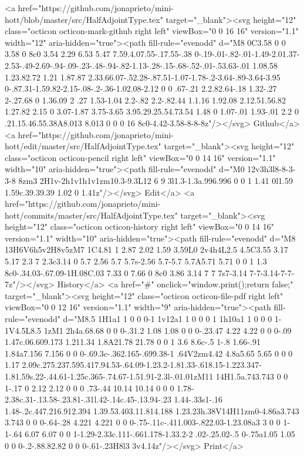       <a href="https://github.com/jonaprieto/mini-hott/blob/master/src/HalfAdjointType.tex" target="_blank"><svg height="12" class="octicon octicon-mark-github right left" viewBox="0 0 16 16" version="1.1" width="12" aria-hidden="true"><path fill-rule="evenodd" d="M8 0C3.58 0 0 3.58 0 8c0 3.54 2.29 6.53 5.47 7.59.4.07.55-.17.55-.38 0-.19-.01-.82-.01-1.49-2.01.37-2.53-.49-2.69-.94-.09-.23-.48-.94-.82-1.13-.28-.15-.68-.52-.01-.53.63-.01 1.08.58 1.23.82.72 1.21 1.87.87 2.33.66.07-.52.28-.87.51-1.07-1.78-.2-3.64-.89-3.64-3.95 0-.87.31-1.59.82-2.15-.08-.2-.36-1.02.08-2.12 0 0 .67-.21 2.2.82.64-.18 1.32-.27 2-.27.68 0 1.36.09 2 .27 1.53-1.04 2.2-.82 2.2-.82.44 1.1.16 1.92.08 2.12.51.56.82 1.27.82 2.15 0 3.07-1.87 3.75-3.65 3.95.29.25.54.73.54 1.48 0 1.07-.01 1.93-.01 2.2 0 .21.15.46.55.38A8.013 8.013 0 0 0 16 8c0-4.42-3.58-8-8-8z"/></svg> Github</a>
      <a href="https://github.com/jonaprieto/mini-hott/edit/master/src/HalfAdjointType.tex" target="_blank"><svg height="12" class="octicon octicon-pencil right left" viewBox="0 0 14 16" version="1.1" width="10" aria-hidden="true"><path fill-rule="evenodd" d="M0 12v3h3l8-8-3-3-8 8zm3 2H1v-2h1v1h1v1zm10.3-9.3L12 6 9 3l1.3-1.3a.996.996 0 0 1 1.41 0l1.59 1.59c.39.39.39 1.02 0 1.41z"/></svg> Edit</a>
      <a href="https://github.com/jonaprieto/mini-hott/commits/master/src/HalfAdjointType.tex" target="_blank"><svg height="12" class="octicon octicon-history right left" viewBox="0 0 14 16" version="1.1" width="10" aria-hidden="true"><path fill-rule="evenodd" d="M8 13H6V6h5v2H8v5zM7 1C4.81 1 2.87 2.02 1.59 3.59L0 2v4h4L2.5 4.5C3.55 3.17 5.17 2.3 7 2.3c3.14 0 5.7 2.56 5.7 5.7s-2.56 5.7-5.7 5.7A5.71 5.71 0 0 1 1.3 8c0-.34.03-.67.09-1H.08C.03 7.33 0 7.66 0 8c0 3.86 3.14 7 7 7s7-3.14 7-7-3.14-7-7-7z"/></svg> History</a>
      <a  href="#" onclick="window.print();return false;" target="_blank"><svg height="12" class="octicon octicon-file-pdf right left" viewBox="0 0 12 16" version="1.1" width="9" aria-hidden="true"><path fill-rule="evenodd" d="M8.5 1H1a1 1 0 0 0-1 1v12a1 1 0 0 0 1 1h10a1 1 0 0 0 1-1V4.5L8.5 1zM1 2h4a.68.68 0 0 0-.31.2 1.08 1.08 0 0 0-.23.47 4.22 4.22 0 0 0-.09 1.47c.06.609.173 1.211.34 1.8A21.78 21.78 0 0 1 3.6 8.6c-.5 1-.8 1.66-.91 1.84a7.156 7.156 0 0 0-.69.3c-.362.165-.699.38-1 .64V2zm4.42 4.8a5.65 5.65 0 0 0 1.17 2.09c.275.237.595.417.94.53-.64.09-1.23.2-1.81.33-.618.15-1.223.347-1.81.59s.22-.44.61-1.25c.365-.74.67-1.51.91-2.3l-.01.01zM11 14H1.5a.743.743 0 0 1-.17 0 2.12 2.12 0 0 0 .73-.44 10.14 10.14 0 0 0 1.78-2.38c.31-.13.58-.23.81-.31l.42-.14c.45-.13.94-.23 1.44-.33s1-.16 1.48-.2c.447.216.912.394 1.39.53.403.11.814.188 1.23.23h.38V14H11zm0-4.86a3.743 3.743 0 0 0-.64-.28 4.221 4.221 0 0 0-.75-.11c-.411.003-.822.03-1.23.08a3 3 0 0 1-1-.64 6.07 6.07 0 0 1-1.29-2.33c.111-.661.178-1.33.2-2 .02-.25.02-.5 0-.75a1.05 1.05 0 0 0-.2-.88.82.82 0 0 0-.61-.23H8l3 3v4.14z"/></svg> Print</a>
